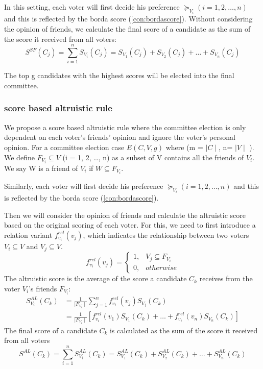 \documentclass[
   a4paper,                      %
   tucfont,                      %
   english,                      %
   tuctitle,                     %
   intoc,                        %
   twoside,                      %
   captions=tableheading,        %
   openright,                    %
   final,                        %
   ]{tuc-thesis}                 %
\begin{document}
In this setting, each voter will first decide his preference $\succeq_{V_i} (i = 1, 2, \dots , n)$ and this is reflected by the borda score (\ref{con:bordascore}). Without considering the opinion of friends, we calculate the final score of a candidate as the sum of the score it received from all voters:
\begin{equation}
S^{SF}(C_j) = \sum_{i=1}^{n} S_{V_i}(C_j)= S_{V_1}(C_j) + S_{V_2}(C_j) + \dots + S_{V_n}(C_j)\label{SB:SF_aggr_voter_Score}
\end{equation}

The top g candidates with the highest scores will be elected into the final committee.

\subsubsection{score based altruistic rule}
We propose a score based altruistic rule where the committee election is only dependent on each voter's friends' opinion and ignore the voter's personal opinion. For a committee election case  $E(C,V,g)$ where (m = $\mid C \mid$, n= $\mid V \mid$ ). We define $F_{V_i}  \subseteq V$ (i = 1, 2,  \dots , n) as a subset of V contains all the friends of $V_i$. We say W is a friend of $V_i$ if $W \subseteq F_{V_i}$.

Similarly, each voter will first decide his preference $\succeq_{V_i} (i = 1, 2, \dots , n)$ and this is reflected by the borda score (\ref{con:bordascore}).

Then we will consider the opinion of friends and calculate the altruistic score based on the original scoring of each voter. For this, we need to first introduce a relation variant $f_{v_i}^{rel}(v_j)$, which indicates the relationship between two voters $V_i\subseteq V$ and $V_j\subseteq V$. 
 \begin{equation}
 f_{v_i}^{rel}(v_j) =\begin{cases}
        1, &V_j \subseteq F_{V_i} \\
        0, &otherwise
        \end{cases}\label{re:RL}
\end{equation}
The altruistic score is the average of the score a candidate $C_k$ receives from the voter $V_i$'s friends $F_{V_i}$:
\begin{equation}
\begin{split}
S_{V_i}^{AL}(C_k) &= \frac{1}{\mid F_{V_i}\mid}\sum_{j=1}^{n} f_{v_i}^{rel}(v_j)S_{V_j}(C_k) \\
            &= \frac{1}{\mid F_{V_i}\mid}[f_{v_i}^{rel}(v_1)S_{V_1}(C_k) + \dots + f_{v_i}^{rel}(v_n)S_{V_n}(C_k)]\label{SB:AL_singlevoter_Score}
\end{split}
\end{equation}
The final score of a candidate $C_k$ is calculated as the sum of the score it received from all voters
\begin{equation}
S^{AL}(C_k) = \sum_{i=1}^{n} S_{V_i}^{AL}(C_k)= S_{V_1}^{AL}(C_k) + S_{V_2}^{AL}(C_k) + \dots + S_{V_n}^{AL}(C_k)\label{SB:AL_aggr_voter_Score}
\end{equation}
\end{document}
